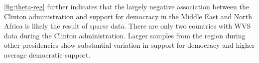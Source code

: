 \documentclass[12pt]{article}
\begin{document}
\autoref{fig:theta-reg} further indicates that the largely negative association between the Clinton administration and support for democracy in the Middle East and North Africa is likely the result of sparse data. 
There are only two countries with WVS data during the Clinton administration. 
Larger samples from the region during other presidencies show substantial variation in support for democracy and higher average democratic support. 


%
%


  
 
 
\end{document}
